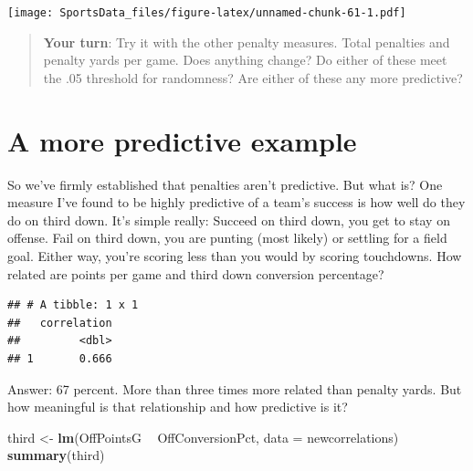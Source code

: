 \documentclass[]{book}
\newenvironment{Shaded}{\begin{snugshade}}{\end{snugshade}}
\newcommand{\DataTypeTok}[1]{\textcolor[rgb]{0.13,0.29,0.53}{#1}}
\newcommand{\KeywordTok}[1]{\textcolor[rgb]{0.13,0.29,0.53}{\textbf{#1}}}
\newcommand{\NormalTok}[1]{#1}
\newcommand{\OperatorTok}[1]{\textcolor[rgb]{0.81,0.36,0.00}{\textbf{#1}}}
\newcommand{\StringTok}[1]{\textcolor[rgb]{0.31,0.60,0.02}{#1}}
\begin{document}
\texttt{[image: SportsData\_files/figure-latex/unnamed-chunk-61-1.pdf]}

\begin{quote}
\textbf{Your turn}: Try it with the other penalty measures. Total penalties and penalty yards per game. Does anything change? Do either of these meet the .05 threshold for randomness? Are either of these any more predictive?
\end{quote}

\hypertarget{a-more-predictive-example}{%
\section{A more predictive example}\label{a-more-predictive-example}}

So we've firmly established that penalties aren't predictive. But what is? One measure I've found to be highly predictive of a team's success is how well do they do on third down. It's simple really: Succeed on third down, you get to stay on offense. Fail on third down, you are punting (most likely) or settling for a field goal. Either way, you're scoring less than you would by scoring touchdowns. How related are points per game and third down conversion percentage?

\begin{Shaded}
\end{Shaded}

\begin{verbatim}
## # A tibble: 1 x 1
##   correlation
##         <dbl>
## 1       0.666
\end{verbatim}

Answer: 67 percent. More than three times more related than penalty yards. But how meaningful is that relationship and how predictive is it?

\begin{Shaded}
\begin{Highlighting}[]
\NormalTok{third <-}\StringTok{ }\KeywordTok{lm}\NormalTok{(OffPointsG }\OperatorTok{~}\StringTok{ }\NormalTok{OffConversionPct, }\DataTypeTok{data =}\NormalTok{ newcorrelations)}
\KeywordTok{summary}\NormalTok{(third)}
\end{Highlighting}
\end{Shaded}
\end{document}
